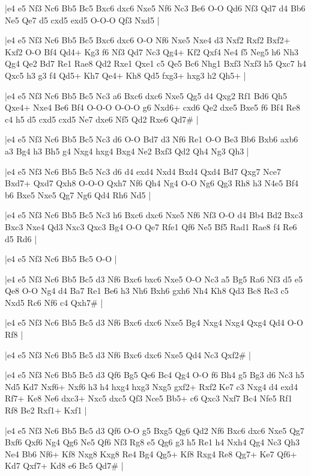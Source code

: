 \whitename{}
\blackname{}
\makegametitle
|e4 e5 Nf3 Nc6 Bb5 Bc5 Bxc6 dxc6 Nxe5 Nf6 Nc3 Be6 O-O Qd6 Nf3 Qd7 d4 Bb6 Ne5 Qe7 d5 cxd5 exd5 O-O-O Qf3 Nxd5  |

\whitename{}
\blackname{}
\makegametitle
|e4 e5 Nf3 Nc6 Bb5 Bc5 Bxc6 dxc6 O-O Nf6 Nxe5 Nxe4 d3 Nxf2 Rxf2 Bxf2+ Kxf2 O-O Bf4 Qd4+ Kg3 f6 Nf3 Qd7 Nc3 Qg4+ Kf2 Qxf4 Ne4 f5 Neg5 h6 Nh3 Qg4 Qe2 Bd7 Re1 Rae8 Qd2 Rxe1 Qxe1 c5 Qe5 Bc6 Nhg1 Bxf3 Nxf3 h5 Qxc7 h4 Qxc5 h3 g3 f4 Qd5+ Kh7 Qe4+ Kh8 Qd5 fxg3+ hxg3 h2 Qh5+  |

\whitename{}
\blackname{}
\makegametitle
|e4 e5 Nf3 Nc6 Bb5 Bc5 Nc3 a6 Bxc6 dxc6 Nxe5 Qg5 d4 Qxg2 Rf1 Bd6 Qh5 Qxe4+ Nxe4 Be6 Bf4 O-O-O O-O-O g6 Nxd6+ cxd6 Qe2 dxe5 Bxe5 f6 Bf4 Re8 c4 h5 d5 cxd5 cxd5 Ne7 dxe6 Nf5 Qd2 Rxe6 Qd7\#  |

\whitename{}
\blackname{}
\makegametitle
|e4 e5 Nf3 Nc6 Bb5 Bc5 Nc3 d6 O-O Bd7 d3 Nf6 Re1 O-O Be3 Bb6 Bxb6 axb6 a3 Bg4 h3 Bh5 g4 Nxg4 hxg4 Bxg4 Ne2 Bxf3 Qd2 Qh4 Ng3 Qh3  |

\whitename{}
\blackname{}
\makegametitle
|e4 e5 Nf3 Nc6 Bb5 Bc5 Nc3 d6 d4 exd4 Nxd4 Bxd4 Qxd4 Bd7 Qxg7 Nce7 Bxd7+ Qxd7 Qxh8 O-O-O Qxh7 Nf6 Qh4 Ng4 O-O Ng6 Qg3 Rh8 h3 N4e5 Bf4 b6 Bxe5 Nxe5 Qg7 Ng6 Qd4 Rh6 Nd5  |

\whitename{}
\blackname{}
\makegametitle
|e4 e5 Nf3 Nc6 Bb5 Bc5 Nc3 h6 Bxc6 dxc6 Nxe5 Nf6 Nf3 O-O d4 Bb4 Bd2 Bxc3 Bxc3 Nxe4 Qd3 Nxc3 Qxc3 Bg4 O-O Qe7 Rfe1 Qf6 Ne5 Bf5 Rad1 Rae8 f4 Re6 d5 Rd6  |

\whitename{}
\blackname{}
\makegametitle
|e4 e5 Nf3 Nc6 Bb5 Bc5 O-O  |

\whitename{}
\blackname{}
\makegametitle
|e4 e5 Nf3 Nc6 Bb5 Bc5 d3 Nf6 Bxc6 bxc6 Nxe5 O-O Nc3 a5 Bg5 Ra6 Nf3 d5 e5 Qe8 O-O Ng4 d4 Ba7 Re1 Be6 h3 Nh6 Bxh6 gxh6 Nh4 Kh8 Qd3 Bc8 Re3 c5 Nxd5 Rc6 Nf6 c4 Qxh7\#  |

\whitename{}
\blackname{}
\makegametitle
|e4 e5 Nf3 Nc6 Bb5 Bc5 d3 Nf6 Bxc6 dxc6 Nxe5 Bg4 Nxg4 Nxg4 Qxg4 Qd4 O-O Rf8  |

\whitename{}
\blackname{}
\makegametitle
|e4 e5 Nf3 Nc6 Bb5 Bc5 d3 Nf6 Bxc6 dxc6 Nxe5 Qd4 Nc3 Qxf2\#  |

\whitename{}
\blackname{}
\makegametitle
|e4 e5 Nf3 Nc6 Bb5 Bc5 d3 Qf6 Bg5 Qe6 Bc4 Qg4 O-O f6 Bh4 g5 Bg3 d6 Nc3 h5 Nd5 Kd7 Nxf6+ Nxf6 h3 h4 hxg4 hxg3 Nxg5 gxf2+ Rxf2 Ke7 c3 Nxg4 d4 exd4 Rf7+ Ke8 Ne6 dxc3+ Nxc5 dxc5 Qf3 Nce5 Bb5+ c6 Qxc3 Nxf7 Bc4 Nfe5 Rf1 Rf8 Be2 Rxf1+ Kxf1  |

\whitename{}
\blackname{}
\makegametitle
|e4 e5 Nf3 Nc6 Bb5 Bc5 d3 Qf6 O-O g5 Bxg5 Qg6 Qd2 Nf6 Bxc6 dxc6 Nxe5 Qg7 Bxf6 Qxf6 Ng4 Qg6 Ne5 Qf6 Nf3 Rg8 e5 Qg6 g3 h5 Re1 h4 Nxh4 Qg4 Nc3 Qh3 Ne4 Bb6 Nf6+ Kf8 Nxg8 Kxg8 Re4 Bg4 Qg5+ Kf8 Rxg4 Re8 Qg7+ Ke7 Qf6+ Kd7 Qxf7+ Kd8 e6 Bc5 Qd7\#  |

